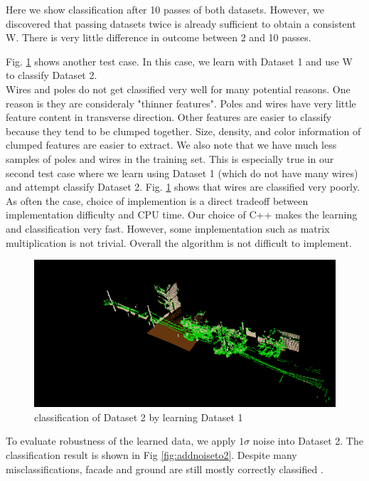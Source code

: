 \documentclass[letterpaper]{article}
\begin{document}
 Here we show classification after 10 passes of both datasets. However, we discovered that passing datasets twice is already sufficient to obtain a consistent W. There is very little difference in outcome between 2 and 10 passes. 

\pagebreak

Fig. \ref{fig:learned1_apply2} shows another test case. In this case, we learn with Dataset 1 and use W to classify Dataset 2.\\

Wires and poles do not get classified very well for many potential reasons. One reason is they are consideraly "thinner features". Poles and wires have very little feature content in transverse direction. Other features are easier to classify because they tend to be clumped together. Size, density, and color information of clumped features are easier to extract.  We also note that we have much less samples of poles and wires in the  training set. This is especially true in our second test case where we learn using Dataset 1 (which do not have many wires) and attempt classify Dataset 2. Fig. \ref{fig:learned1_apply2} shows that wires are classified very poorly. \\

As often the case, choice of implemention is a direct tradeoff between implementation difficulty and CPU time. Our choice of C++ makes the learning and classification very fast. However, some implementation such as matrix multiplication is not trivial. Overall the algorithm is not difficult to implement.

\begin{figure}[h]
  \centering
\includegraphics[scale = 0.4]{learned1_apply2}
\caption{classification of Dataset 2 by learning Dataset 1}
\label{fig:learned1_apply2}
\end{figure}

To evaluate robustness of the learned data, we apply $1 \sigma$ noise into Dataset 2. The classification result is shown in Fig \ref{fig:addnoiseto2}. Despite many misclassifications, facade and ground are still mostly correctly classified .
\end{document}
